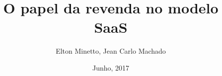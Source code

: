 \usepackage{graphicx}
\usepackage[utf8]{inputenc}
\title{O papel da revenda no modelo SaaS}
\author{Elton Minetto, Jean Carlo Machado}
\date{Junho, 2017}
\usepackage[overlay,absolute]{textpos}
\usepackage{ragged2e}
\justifying
{}
\geometry{paperwidth=140mm,paperheight=105mm}
